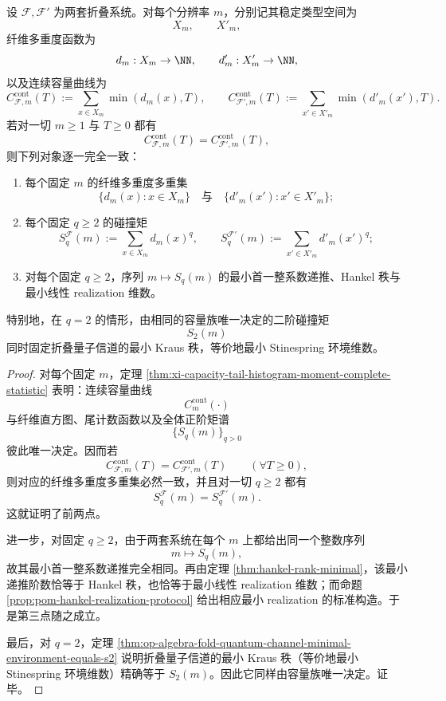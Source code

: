 \begin{theorem}[容量族的完备可恢复性与碰撞层级的全决定]\label{thm:conclusion-capacity-family-complete-recovery-collision-hankel-quantum}
设 \(\mathcal F,\mathcal F'\) 为两套折叠系统。对每个分辨率 \(m\)，分别记其稳定类型空间为
\[
X_m,\qquad X'_m,
\]
纤维多重度函数为
\[
d_m:X_m\to\NN,
\qquad
d'_m:X'_m\to\NN,
\]
以及连续容量曲线为
\[
C^{\mathrm{cont}}_{\mathcal F,m}(T):=\sum_{x\in X_m}\min(d_m(x),T),
\qquad
C^{\mathrm{cont}}_{\mathcal F',m}(T):=\sum_{x'\in X'_m}\min(d'_m(x'),T).
\]
若对一切 \(m\ge 1\) 与 \(T\ge 0\) 都有
\[
C^{\mathrm{cont}}_{\mathcal F,m}(T)=C^{\mathrm{cont}}_{\mathcal F',m}(T),
\]
则下列对象逐一完全一致：
\begin{enumerate}
  \item 每个固定 \(m\) 的纤维多重度多重集
  \[
  \{d_m(x):x\in X_m\}
  \quad\text{与}\quad
  \{d'_m(x'):x'\in X'_m\};
  \]
  \item 每个固定 \(q\ge 2\) 的碰撞矩
  \[
  S_q^{\mathcal F}(m):=\sum_{x\in X_m}d_m(x)^q,
  \qquad
  S_q^{\mathcal F'}(m):=\sum_{x'\in X'_m}d'_m(x')^q;
  \]
  \item 对每个固定 \(q\ge 2\)，序列 \(m\mapsto S_q(m)\) 的最小首一整系数递推、Hankel 秩与最小线性 realization 维数。
\end{enumerate}
特别地，在 \(q=2\) 的情形，由相同的容量族唯一决定的二阶碰撞矩
\[
S_2(m)
\]
同时固定折叠量子信道的最小 Kraus 秩，等价地最小 Stinespring 环境维数。
\end{theorem}
\begin{proof}
对每个固定 \(m\)，定理 \ref{thm:xi-capacity-tail-histogram-moment-complete-statistic} 表明：连续容量曲线
\[
C_m^{\mathrm{cont}}(\cdot)
\]
与纤维直方图、尾计数函数以及全体正阶矩谱
\[
\{S_q(m)\}_{q>0}
\]
彼此唯一决定。因而若
\[
C^{\mathrm{cont}}_{\mathcal F,m}(T)=C^{\mathrm{cont}}_{\mathcal F',m}(T)
\qquad(\forall T\ge 0),
\]
则对应的纤维多重度多重集必然一致，并且对一切 \(q\ge 2\) 都有
\[
S_q^{\mathcal F}(m)=S_q^{\mathcal F'}(m).
\]
这就证明了前两点。

进一步，对固定 \(q\ge 2\)，由于两套系统在每个 \(m\) 上都给出同一个整数序列
\[
m\longmapsto S_q(m),
\]
故其最小首一整系数递推完全相同。再由定理 \ref{thm:hankel-rank-minimal}，该最小递推阶数恰等于 Hankel 秩，也恰等于最小线性 realization 维数；而命题 \ref{prop:pom-hankel-realization-protocol} 给出相应最小 realization 的标准构造。于是第三点随之成立。

最后，对 \(q=2\)，定理 \ref{thm:op-algebra-fold-quantum-channel-minimal-environment-equals-s2} 说明折叠量子信道的最小 Kraus 秩（等价地最小 Stinespring 环境维数）精确等于 \(S_2(m)\)。因此它同样由容量族唯一决定。证毕。
\end{proof}

